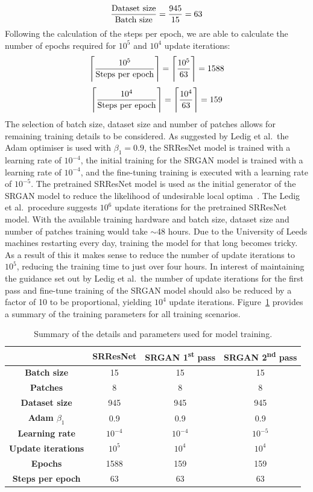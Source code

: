 \[\frac{\textnormal{Dataset size}}{\textnormal{Batch size}} = \frac{945}{15} = 63\]
Following the calculation of the steps per epoch, we are able to calculate the number of epochs required for $10^5$ and $10^4$ update iterations:
\[\Bigg\lceil\frac{10^5}{\textnormal{Steps per epoch}}\Bigg\rceil = \Bigg\lceil\frac{10^5}{63}\Bigg\rceil = 1588\]
\[\Bigg\lceil\frac{10^4}{\textnormal{Steps per epoch}}\Bigg\rceil = \Bigg\lceil\frac{10^4}{63}\Bigg\rceil = 159\]
The selection of batch size, dataset size and number of patches allows for remaining training details to be considered. As suggested by Ledig et al.\ the Adam optimiser is used with $\beta_1 = 0.9$, the SRResNet model is trained with a learning rate of $10^{-4}$, the initial training for the SRGAN model is trained with a learning rate of $10^{-4}$, and the fine-tuning training is executed with a learning rate of $10^{-5}$. The pretrained SRResNet model is used as the initial generator of the SRGAN model to reduce the likelihood of undesirable local optima~\cite{srgan}. The Ledig et al.\ procedure suggests $10^6$ update iterations for the pretrained SRResNet model. With the available training hardware and batch size, dataset size and number of patches training would take $\sim$48 hours. Due to the University of Leeds machines restarting every day, training the model for that long becomes tricky. As a result of this it makes sense to reduce the number of update iterations to $10^{5}$, reducing the training time to just over four hours. In interest of maintaining the guidance set out by Ledig et al.\ the number of update iterations for the first pass and fine-tune training of the SRGAN model should also be reduced by a factor of 10 to be proportional, yielding $10^4$ update iterations. Figure~\ref{table:model_training} provides a summary of the training parameters for all training scenarios.
\begin{table}
    \centering
    \begin{tabular}{cccc}
        \toprule
        {} & \textbf{SRResNet} & \textbf{SRGAN 1\textsuperscript{st} pass} & \textbf{SRGAN 2\textsuperscript{nd} pass} \\
        \midrule
        \textbf{Batch size} & 15 & 15 & 15\\ 
        \textbf{Patches} & 8 & 8 & 8 \\
        \textbf{Dataset size} & 945 & 945 & 945\\
        \textbf{Adam $\beta_1$} & 0.9 & 0.9 & 0.9\\
        \textbf{Learning rate} & $10^{-4}$ & $10^{-4}$ & $10^{-5}$ \\
        \textbf{Update iterations} & $10^5$ & $10^4$ & $10^4$ \\
        \textbf{Epochs} & 1588 & 159 & 159 \\
        \textbf{Steps per epoch} & 63 & 63 & 63 \\
        \bottomrule
    \end{tabular}
    \caption{Summary of the details and parameters used for model training.}
    \label{table:model_training}
\end{table}

